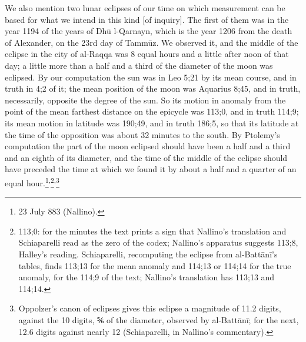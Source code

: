 \documentclass[11pt]{article}
\begin{document}
\par We also mention two lunar eclipses of our time on which measurement can be based for what we intend in this kind [of inquiry]. The first of them was in the year 1194 of the years of Dhū l-Qarnayn, which is the year 1206 from the death of Alexander, on the 23rd day of Tammūz. We observed it, and the middle of the eclipse in the city of al-Raqqa was 8 equal hours and a little after noon of that day; a little more than a half and a third of the diameter of the moon was eclipsed. By our computation the sun was in Leo 5;21 by its mean course, and in truth in 4;2 of it; the mean position of the moon was Aquarius 8;45, and in truth, necessarily, opposite the degree of the sun. So its motion in anomaly from the point of the mean farthest distance on the epicycle was 113;0, and in truth 114;9; its mean motion in latitude was 190;49, and in truth 186;5, so that its latitude at the time of the opposition was about 32 minutes to the south. By Ptolemy's computation the part of the moon eclipsed should have been a half and a third and an eighth of its diameter, and the time of the middle of the eclipse should have preceded the time at which we found it by about a half and a quarter of an equal hour.\footnote{23 July 883 (Nallino).}\textsuperscript{,}\footnote{113;0: for the minutes the text prints a sign that Nallino's translation and Schiaparelli read as the zero of the codex; Nallino's apparatus suggests 113;8, Halley's reading. Schiaparelli, recomputing the eclipse from al-Battānī's tables, finds 113;13 for the mean anomaly and 114;13 or 114;14 for the true anomaly, for the 114;9 of the text; Nallino's translation has 113;13 and 114;14.}\textsuperscript{,}\footnote{Oppolzer's canon of eclipses gives this eclipse a magnitude of 11.2 digits, against the 10 digits, ⅚ of the diameter, observed by al-Battānī; for the next, 12.6 digits against nearly 12 (Schiaparelli, in Nallino's commentary).}\par
\end{document}
